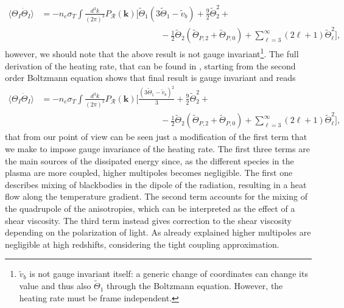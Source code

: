 \begin{align*}
    \langle\Theta_I\dot \Theta_I\rangle&=-n_e\sigma_T\int\frac{d^3k}{(2\pi)^3}{P}_\mathcal{R} (\mathbf{k})\bigg[\tilde\Theta_1( 3\tilde\Theta_1-\tilde v_b)+\frac{9}{2}\tilde\Theta_2^2+\nonumber\\&\qquad\qquad\qquad\qquad\qquad\qquad\qquad-\frac{1}{2}\tilde\Theta_2(\tilde\Theta_{P,2}+\tilde\Theta_{P,0})+\sum_{\ell=3}^{\infty}(2\ell+1)\tilde\Theta_\ell^2\bigg],
\end{align*}
however, we should note that the above result is not gauge invariant\footnote{$\tilde v_b$ is not gauge invariant itself: a generic change of coordinates can change its value and thus also $\tilde\Theta_1$ through the Boltzmann equation. However, the heating rate must be frame independent.}. The full derivation of the heating rate, that can be found in \cite{Chluba_2x2}, starting from the second order Boltzmann equation shows that final result is gauge invariant and reads
\begin{align}
    \langle\Theta_I\dot \Theta_I\rangle&=-n_e\sigma_T\int\frac{d^3k}{(2\pi)^3}{P}_\mathcal{R} (\mathbf{k})\bigg[\frac{( 3\tilde\Theta_1-\tilde v_b)^2}{3}+\frac{9}{2}\tilde\Theta_2^2+\nonumber\\&\qquad\qquad\qquad\qquad\qquad\qquad\qquad-\frac{1}{2}\tilde\Theta_2(\tilde\Theta_{P,2}+\tilde\Theta_{P,0})+\sum_{\ell=3}^{\infty}(2\ell+1)\tilde\Theta_\ell^2\bigg],
    \label{eq:TT_I_average_scalar}
\end{align}
that from our point of view can be seen just a modification of the first term that we make to impose gauge invariance of the heating rate. The first three terms are the main sources of the dissipated energy since, as the different species in the plasma are more coupled, higher multipoles becomes negligible. The first one describes mixing of blackbodies in the dipole of the radiation, resulting in a heat flow along the temperature gradient. The second term accounts for the mixing of the quadrupole of the anisotropies, which can be interpreted as the effect of a shear viscosity. The third term instead gives correction to the shear viscosity depending on the polarization of light. As already explained higher multipoles are negligible at high redshifts, considering the tight coupling approximation.

